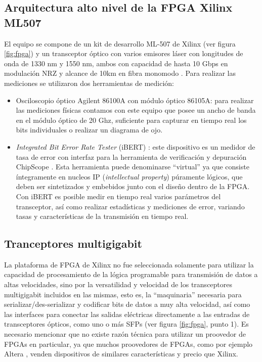 \subsection{Arquitectura alto nivel de la FPGA Xilinx ML507}
El equipo se compone de un kit de desarrollo ML-507 de Xilinx \cite{virtex5fpga} (ver figura \ref{fig:fpga}) y un transceptor óptico con varios emisores láser con longitudes de onda de 1330 nm y 1550 nm, ambos con capacidad de hasta 10 Gbps en modulación NRZ y alcance de 10km en fibra monomodo \cite{virtex5fpgaRIO}. Para realizar las mediciones se utilizaron dos herramientas de medición:
\begin{itemize}
 \item Osciloscopio óptico Agilent 86100A con módulo óptico 86105A: para
realizar las mediciones físicas contamos con este equipo que posee un
ancho de banda en el módulo óptico de 20 Ghz, suficiente para capturar en
tiempo real los bits individuales o realizar un diagrama de ojo.
\item {\em Integrated Bit Error Rate Tester} (iBERT) \cite{4gtxs}: este dispositivo es un medidor de tasa de error con interfaz para la herramienta de
verificación y depuración ChipScope \cite{arshak2006testing}. Esta herramienta puede denominarse ``virtual'' ya que consiste íntegramente en nucleos IP (\textit{intellectual property}) púramente lógicos, que deben ser sintetizados y embebidos junto con el diseño dentro de la FPGA.
Con iBERT es posible medir en tiempo real varios parámetros del transceptor, así como realizar estadísticas y mediciones de error, variando tasas y características de la transmisión en tiempo real.
 
\end{itemize}
\subsection{Tranceptores multigigabit}
La plataforma de FPGA de Xilinx no fue seleccionada solamente para utilizar la capacidad de procesamiento de la lógica programable para transmisión de datos a altas velocidades, sino por la versatilidad y velocidad de los transceptores multigigabit incluidos en las mismas, esto es, la ``maquinaria'' necesaria para serializar/des-serializar y codificar bits de datos a muy alta velocidad, así como las interfaces para conectar las salidas eléctricas directamente a las entradas de transceptores ópticos, como uno o más SFPs \cite{ug198} (ver figura \ref{fig:fpga}, punto 1). Es necesario mencionar que no existe razón técnica para utilizar un proovedor de FPGAs en particular, ya que muchos proovedores de FPGAs, como por ejemplo Altera \cite{Altera}, venden dispositivos de similares características y precio que Xilinx.

